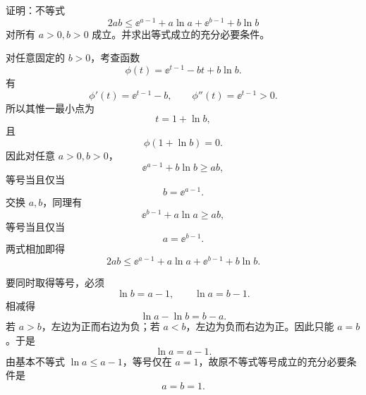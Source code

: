 \begin{xreferenceproblem}[6]
证明：不等式
  \[
    2ab\le\ee^{a-1}+a\ln a+\ee^{b-1}+b\ln b
  \]
  对所有 $a>0,b>0$ 成立。并求出等式成立的充分必要条件。
\end{xreferenceproblem}
\begin{xsolution}
对任意固定的 $b>0$，考查函数
\[
  \phi(t)=\ee^{t-1}-bt+b\ln b.
\]
有
\[
  \phi'(t)=\ee^{t-1}-b,
  \qquad
  \phi''(t)=\ee^{t-1}>0.
\]
所以其惟一最小点为
\[
  t=1+\ln b,
\]
且
\[
  \phi(1+\ln b)=0.
\]
因此对任意 $a>0,b>0$，
\[
  \ee^{a-1}+b\ln b\ge ab,
\]
等号当且仅当
\[
  b=\ee^{a-1}.
\]
交换 $a,b$，同理有
\[
  \ee^{b-1}+a\ln a\ge ab,
\]
等号当且仅当
\[
  a=\ee^{b-1}.
\]
两式相加即得
\[
  2ab\le\ee^{a-1}+a\ln a+\ee^{b-1}+b\ln b.
\]

要同时取得等号，必须
\[
  \ln b=a-1,
  \qquad
  \ln a=b-1.
\]
相减得
\[
  \ln a-\ln b=b-a.
\]
若 $a>b$，左边为正而右边为负；若 $a<b$，左边为负而右边为正。因此只能 $a=b$。于是
\[
  \ln a=a-1.
\]
由基本不等式 $\ln a\le a-1$，等号仅在 $a=1$，故原不等式等号成立的充分必要条件是
\[
  a=b=1.
\]
\end{xsolution}


